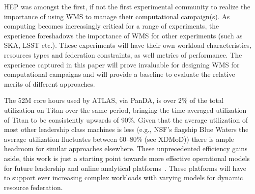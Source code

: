 
HEP was amongst the first, if not the first experimental community to realize
the importance of using WMS to manage their computational campaign(s). As
computing becomes increasingly critical for a range of experiments, the
experience foreshadows the importance of WMS for other experiments (such as
SKA, LSST etc.).  These experiments will have their own workload
characteristics, resources types and federation constraints, as well metrics
of performance. The experience captured in this paper will prove invaluable
for designing WMS for computational campaigns and will provide a baseline to
evaluate the relative merits of different approaches.

The 52M core hours used by ATLAS, via PanDA, is over 2\% of the total
utilization on Titan over the same period, bringing the time-averaged
utilization of Titan to be consistently upwards of 90\%. Given that the
average utilization of most other leadership class machines is less (e.g.,
NSF's flagship Blue Waters the average utilization fluctuates between
60--80\% (see XDMoD\cite{bw-sucks})) there is ample headroom for similar
approaches elsewhere. These unprecedented efficiency gains aside, this work
is just a starting point towards more effective operational models for future
leadership and online analytical platforms~\cite{foap-url}. These platforms
will have to support ever increasing complex workloads with varying models
for dynamic resource federation.


